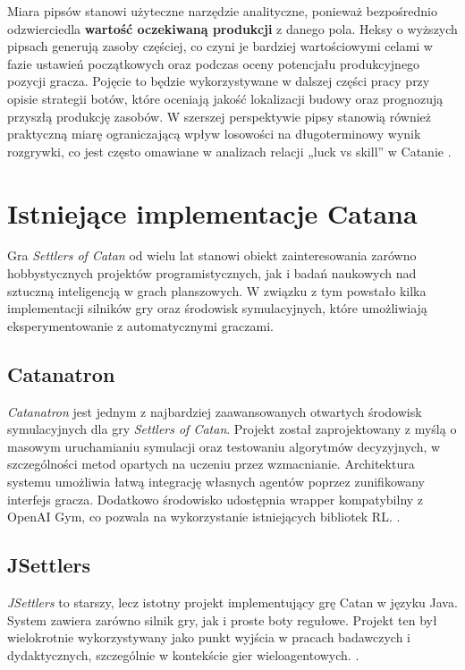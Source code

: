 \documentclass[polish,inz,longabstract]{iithesis}
\begin{document}
Miara pipsów stanowi użyteczne narzędzie analityczne, ponieważ bezpośrednio odzwierciedla \textbf{wartość oczekiwaną produkcji} z danego pola. Heksy o wyższych pipsach generują zasoby częściej, co czyni je bardziej wartościowymi celami w fazie ustawień początkowych oraz podczas oceny potencjału produkcyjnego pozycji gracza. Pojęcie to będzie wykorzystywane w dalszej części pracy przy opisie strategii botów, które oceniają jakość lokalizacji budowy oraz prognozują przyszłą produkcję zasobów. W szerszej perspektywie pipsy stanowią również praktyczną miarę ograniczającą wpływ losowości na długoterminowy wynik rozgrywki, co jest często omawiane w analizach relacji „luck vs skill” w Catanie \cite{10}.

\section{Istniejące implementacje Catana}

Gra \textit{Settlers of Catan} od wielu lat stanowi obiekt zainteresowania zarówno hobbystycznych projektów programistycznych, jak i badań naukowych nad sztuczną inteligencją w grach planszowych. W związku z tym powstało kilka implementacji silników gry oraz środowisk symulacyjnych, które umożliwiają eksperymentowanie z automatycznymi graczami.

\subsection{Catanatron}

\textit{Catanatron} jest jednym z najbardziej zaawansowanych otwartych środowisk symulacyjnych dla gry \textit{Settlers of Catan}. Projekt został zaprojektowany z myślą o masowym uruchamianiu symulacji oraz testowaniu algorytmów decyzyjnych, w szczególności metod opartych na uczeniu przez wzmacnianie. Architektura systemu umożliwia łatwą integrację własnych agentów poprzez zunifikowany interfejs gracza. Dodatkowo środowisko udostępnia wrapper kompatybilny z OpenAI Gym, co pozwala na wykorzystanie istniejących bibliotek RL. \cite{1}.

\subsection{JSettlers}

\textit{JSettlers} to starszy, lecz istotny projekt implementujący grę Catan w języku Java. System zawiera zarówno silnik gry, jak i proste boty regułowe. Projekt ten był wielokrotnie wykorzystywany jako punkt wyjścia w pracach badawczych i dydaktycznych, szczególnie w kontekście gier wieloagentowych. \cite{2}.
\end{document}
